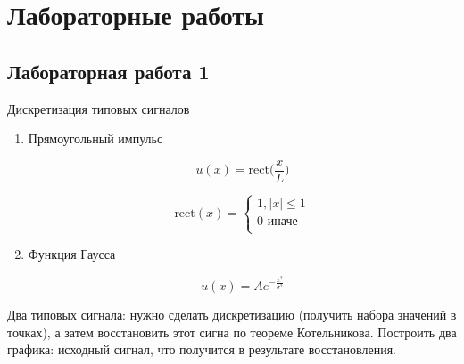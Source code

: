 \section{Лабораторные работы}

\subsection{Лабораторная работа 1}

Дискретизация типовых сигналов

\begin{enumerate}
    \item Прямоугольный импульс

        \begin{equation*}
            u(x) = \text{rect}\big(\frac{x}{L}\big)
        \end{equation*}

        \begin{equation*}
            \text{rect}(x) =
            \begin{cases}
                1, \mid x \mid \le 1 \\
                0 \text{ иначе} \\
            \end{cases}
        \end{equation*}

    \item Функция Гаусса

        \begin{equation*}
            u(x) = A e^{-\frac{x^2}{\sigma^2}}
        \end{equation*}
\end{enumerate}

Два типовых сигнала: нужно сделать дискретизацию (получить набора значений в точках), а затем восстановить этот сигна по теореме Котельникова. Построить два графика: исходный сигнал, что получится в результате восстановления.
